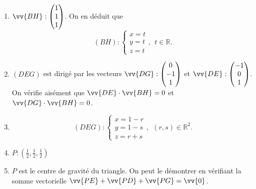 \documentclass[12pt,a4paper,french]{article}
\newcommand{\R}{\mathbb{R}}
\begin{document}
\begin{solution}
  \begin{enumerate}
  \item $\vv{BH} : \left( \begin{matrix} 1\\1\\1 \end{matrix} \right)$.
    On en déduit que \[ (BH) : \left\{ \begin{matrix} x = t \\ y = t\\ z
      = t \end{matrix}, \ \ t \in \R \right. .\]
    \item $(DEG)$ est dirigé par les vecteurs $\vv{DG} :  \left(
    \begin{matrix} 0\\-1\\1 \end{matrix} \right)$ et $\vv{DE} :  \left(
    \begin{matrix} -1\\0\\1 \end{matrix} \right)$. On vérifie aisément
      que $\vv{DE} \cdot \vv{BH} = 0$ et $\vv{DG} \cdot \vv{BH} = 0$.
    \item \[ (DEG) : \left\{ \begin{matrix} x = 1-r \\ y = 1 - s\\ z = r
        + s \end{matrix},\ \  (r,s) \in \R^2 \right. .\]
    \item $P: \left(\frac12, \frac12, \frac12\right)$
    \item $P$ est le centre de gravité du triangle. On peut le démontrer
      en vérifiant la somme vectorielle $\vv{PE} + \vv{PD} + \vv{PG} =
      \vv{0}$.
  \end{enumerate}
\end{solution}

\pagebreak

\printsolutions
\end{document}
